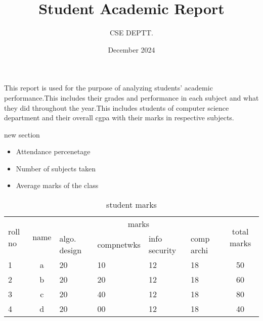 \documentclass{article}
\title{\textbf{Student Academic Report}}
\author{CSE DEPTT.}
\date{December 2024}
\begin{document}
\maketitle
\noindent
This report is used for the purpose of analyzing students' academic performance.This includes their grades and performance in each subject and what they did throughout the year.This includes students of computer science department and their overall cgpa with their marks in respective subjects.
\begin{section}{new section}
    \begin{itemize}
        \item Attendance percenetage
        \item Number of subjects taken
        \item Average marks of the class
    \end{itemize}
    \begin{table}[h]
    \centering
        \caption{student marks}
        \begin{tabular}{|p{1cm}|c|p{1.9cm}|p{1.9cm}|p{1.9cm}|p{1.9cm}|c|}
            \hline
            \multirow{2}{*}{roll no} & \multirow{2}{*}{name} & \multicolumn{4}{c|}{marks} & \multirow{2}{*}{total marks}            \\
            \cline{3-6}
             & & algo. design & compnetwks & info security & comp archi & \\
             \hline
             1 & a & 20 &10 & 12 & 18 & 50 \\
             \hline
             2 & b & 20 &20 & 12 & 18 & 60 \\
             \hline
             3 & c & 20 &40 & 12 & 18 & 80 \\
             \hline
             4 & d & 20 &00 & 12 & 18 & 40 \\
             \hline
        \end{tabular}
    \end{table}
\end{section}
    
\end{document}
